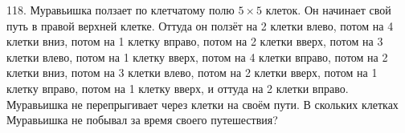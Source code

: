 118. Муравьишка ползает по клетчатому полю $5\times5$ клеток. Он начинает свой путь в правой верхней клетке. Оттуда он ползёт на 2 клетки влево, потом на 4 клетки вниз, потом на 1 клетку вправо, потом на 2 клетки вверх, потом на 3 клетки влево, потом на 1 клетку вверх, потом на 4 клетки вправо, потом на 2 клетки вниз, потом на 3 клетки влево, потом на 2 клетки вверх, потом на 1 клетку вправо, потом на 1 клетку вверх, и оттуда на 2 клетки вправо. Муравьишка не перепрыгивает через клетки на своём пути. В скольких клетках Муравьишка не побывал за время своего путешествия?\\
